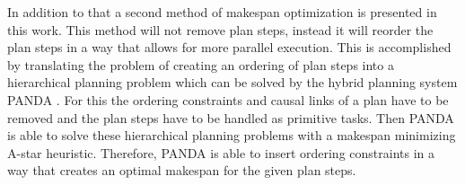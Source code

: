 In addition to that a second method of makespan optimization is presented in this work.
This method will not remove plan steps, instead it will reorder the plan steps in a 
way that allows for more parallel execution.
This is accomplished by translating the problem of creating an ordering of plan steps 
into a hierarchical planning problem which can be solved by the hybrid planning system PANDA \cite{Panda}.
For this the ordering constraints and causal links of a plan have to be removed and 
the plan steps have to be handled as primitive tasks.
Then PANDA is able to solve these hierarchical planning problems with a makespan minimizing A-star heuristic.
Therefore, PANDA is able to insert ordering constraints in a way that 
creates an optimal makespan for the given plan steps. 